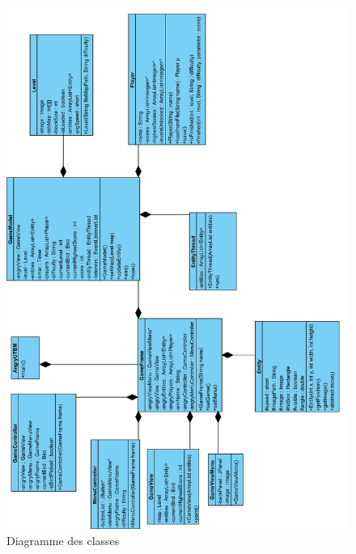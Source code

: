 \documentclass[a4paper,12pt]{report}
\begin{document}
\begin{figure}[H]
\begin{center}
\includegraphics[scale=0.27]{images/diagrammeclasses01.png} 
\end{center}
\caption{Diagramme des classes}
\label{Diagramme des classes}
\end{figure}
\end{document}
